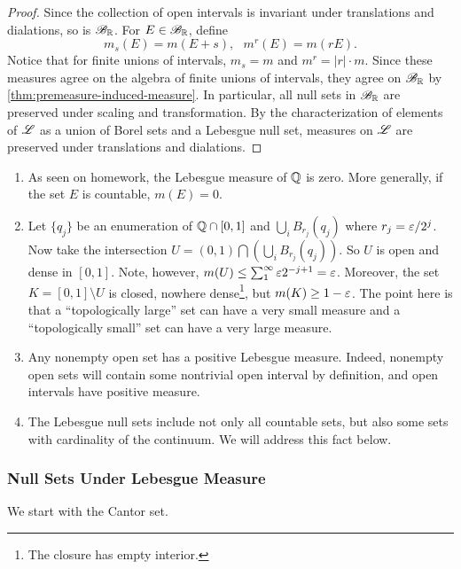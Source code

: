 \documentclass[12pt]{article} %
\begin{document}
\begin{proof}
    Since the collection of open intervals is invariant under translations and dialations, so is $\mathscr{B}_{\mathbb{R}}$. For $E \in \mathscr{B}_{\mathbb{R}}$, define \[m_s(E) = m(E + s), \ \ \ m^r(E) = m(rE).\] Notice that for finite unions of intervals, $m_s = m$ and $m^r = |r| \cdot m$. Since these measures agree on the algebra of finite unions of intervals, they agree on $\mathscr{B}_{\mathbb{R}}$ by \cref{thm:premeasure-induced-measure}. In particular, all null sets in $\mathscr{B}_{\mathbb{R}}$ are preserved under scaling and transformation. By the characterization of elements of $\mathscr{L}$ as a union of Borel sets and a Lebesgue null set, measures on $\mathscr{L}$ are preserved under translations and dialations.
\end{proof}

\begin{remark}
    \begin{enumerate}
        \item As seen on homework, the Lebesgue measure of $\mathbb{Q}$ is zero. More generally, if the set $E$ is countable, $m(E) = 0$.
        \item Let $\{q_j\}$ be an enumeration of $\mathbb{Q} \cap [0,1]$ and $\bigcup_i B_{r_j}(q_j)$ where $r_j = \varepsilon / 2^j$. Now take the intersection $U = (0,1) \bigcap \left( \bigcup_i B_{r_j}(q_j) \right)$. So $U$ is open and dense in $[0,1]$. Note, however, $m(U) \leq \sum_1^\infty \varepsilon 2^{-j+1} = \varepsilon$. Moreover, the set $K = [0,1] \setminus U$ is closed, nowhere dense\footnote{The closure has empty interior.}, but $m(K) \geq 1 - \varepsilon$. The point here is that a ``topologically large'' set can have a very small measure and a ``topologically small'' set can have a very large measure.
        \item Any nonempty open set has a positive Lebesgue measure. Indeed, nonempty open sets will contain some nontrivial open interval by definition, and open intervals have positive measure.
        \item The Lebesgue null sets include not only all countable sets, but also some sets with cardinality of the continuum. We will address this fact below.
    \end{enumerate}
\end{remark}

\subsubsection{Null Sets Under Lebesgue Measure}

We start with the Cantor set.
\end{document}
